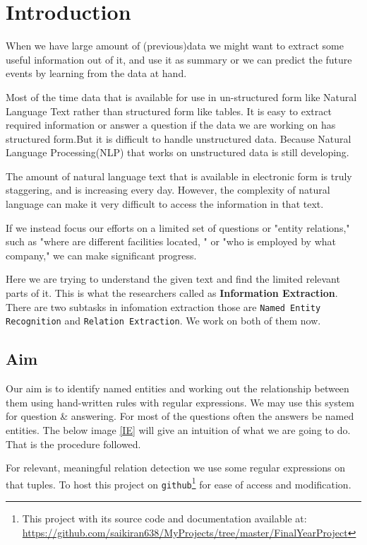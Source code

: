 \documentclass[12pt]{report}
\begin{document}
\chapter{Introduction}
\par When we have large amount of (previous)data we might want to extract some useful information
 out of it, and use it as summary or we can predict the future events by learning from the
 data at hand.
\par Most of the time data that is available for use in un-structured form like Natural Language Text
rather than structured form like tables. It is easy to extract required information or 
answer a question if the data we are working on has structured form.But it is difficult to handle unstructured data. Because Natural Language Processing(NLP)
that works on unstructured data is still developing.
\par The amount of natural language text that is available in electronic 
form is truly staggering, and is increasing every day. 
However, 
the complexity of natural language can make it very difficult to access the information in that text\cite{BookIE}.
\par If we instead focus our efforts on a limited set of questions or 
"entity relations," such as "where are different facilities located,
" or "who is employed by what company," we can make significant progress.\cite{BookIE}
\par Here we are trying to understand the given text and find the limited relevant parts of it.
 This is what the researchers called as \textbf{Information Extraction}. There are two
  subtasks in infomation extraction those are \texttt{Named Entity Recognition} and \texttt{Relation Extraction}. We work on both of them now.
\section{Aim}
\par Our aim is to identify named entities and working out the relationship between them using hand-written
 rules with regular expressions. We may use this system for question \& answering. For most of the questions often the answers be named entities.
The below image \ref{IE} will give an intuition of what we are going to do. That is the procedure followed. 
\par For relevant, meaningful relation detection we use some regular expressions on that tuples.
To host this project on \texttt{github}\footnote{This project with its source code and documentation available at: \url{https://github.com/saikiran638/MyProjects/tree/master/FinalYearProject}} for ease of access and modification.
\end{document}
